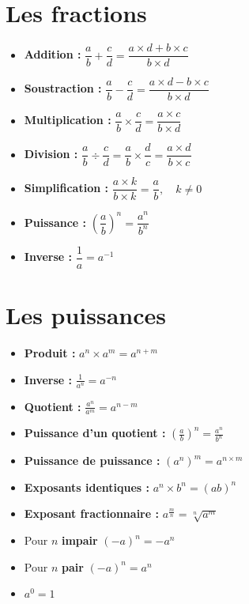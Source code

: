 \documentclass[12]{article}%
\theoremstyle{plain}
\theoremstyle{definition}
\theoremstyle{remark}
\begin{document}
\section{Les fractions}
\large
\begin{itemize}
	\item \textbf{Addition :} \( \boxed{\dfrac{a}{b} + \dfrac{c}{d} = \dfrac{a \times d + b \times c}{b \times d}} \)
	\item \textbf{Soustraction :} \( \dfrac{a}{b} - \dfrac{c}{d} = \dfrac{a \times d - b \times c}{b \times d} \)
	\item \textbf{Multiplication :} \( \dfrac{a}{b} \times \dfrac{c}{d} = \dfrac{a \times c}{b \times d} \)
	\item \textbf{Division :} \( \dfrac{a}{b} \div \dfrac{c}{d} = \dfrac{a}{b} \times \dfrac{d}{c} = \dfrac{a \times d}{b \times c} \)
	\item \textbf{Simplification :} \( \dfrac{a \times k}{b \times k} = \dfrac{a}{b}, \quad k \neq 0 \)
	\item \textbf{Puissance :} \( \left (\dfrac{a}{b}\right )^{n} = \dfrac{a^{n}}{b^{n}} \)
	\item \textbf{Inverse :} \( \dfrac{1}{a} = a^{-1} \)
\end{itemize}
\newpage

\section{Les puissances}
\large
\begin{itemize}
	\item \textbf{Produit :} \( \boxed{a^{n}\times a^{m} = a^{n+m}} \)
	\item \textbf{Inverse :} \( \boxed{\frac{1}{a^{n}} = a^{-n}} \)
	\item \textbf{Quotient :} \( \boxed{\frac{a^{n}}{a^{m}} = a^{n-m}} \)
	\item \textbf{Puissance d'un quotient :} \( \boxed{\left( \frac{a}{b} \right)^n = \frac{a^n}{b^n}} \)
	\item \textbf{Puissance de puissance :} \( \boxed{(a^{n})^{m}=a^{n\times m}} \)
	\item \textbf{Exposants identiques :} \( \boxed{a^{n} \times b^{n} = (ab)^{n}} \)
	\item \textbf{Exposant fractionnaire :} \( \boxed{a^{\frac{m}{n}} = \sqrt[n]{a^m}} \)
	\item Pour $n$ \textbf{impair} \( \boxed{(-a)^{n} = -a^{n}} \)
	\item Pour $n$ \textbf{pair} \( \boxed{(-a)^{n} = a^{n}} \)
	\item \( \boxed{a^{0} = 1} \)
\end{itemize}
\newpage
\end{document}
